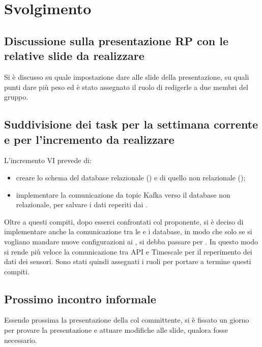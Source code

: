 \newpage
\section*{Svolgimento}

	\subsection*{Discussione sulla presentazione RP con le relative slide da realizzare}
		Si è discusso su quale impostazione dare alle slide della presentazione, su quali punti dare più peso ed è stato assegnato il ruolo di redigerle a due membri del gruppo. 

	\subsection*{Suddivisione dei task per la settimana corrente e per l'incremento da realizzare}
		L'incremento VI prevede di:
			\begin{itemize}
				\item creare lo schema del database relazionale () e di quello non relazionale ();
				\item implementare la comunicazione da topic Kafka verso il database non relazionale, per salvare i dati reperiti dai .
			\end{itemize}
		\newline
		Oltre a questi compiti, dopo esserci confrontati col proponente, si è deciso di implementare anche la comunicazione tra le  e i database, in modo che solo se si vogliano mandare nuove configurazioni ai  , si debba passare per . In questo modo si rende più veloce la comunicazione tra API e Timescale per il reperimento dei dati dei sensori.
		\newline
		Sono stati quindi assegnati i ruoli per portare a termine questi compiti.

	\subsection*{Prossimo incontro informale}
		Essendo prossima la presentazione della  col committente, si è fissato un giorno per provare la presentazione e attuare modifiche alle slide, qualora fosse necessario.
